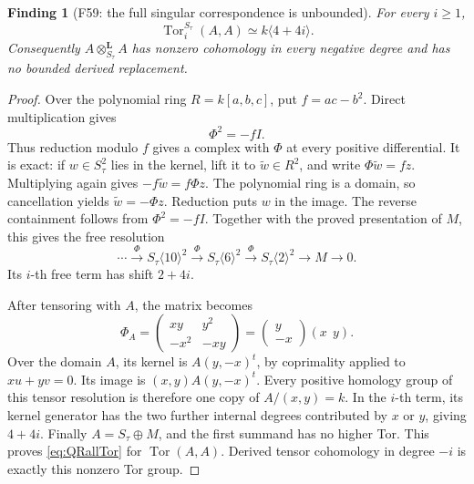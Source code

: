 \documentclass[11pt,a4paper]{article}
\theoremstyle{named}\newtheorem{finding}{Finding}[section]
\theoremstyle{definition}\newtheorem{definition}[finding]{Definition}
\theoremstyle{remark}\newtheorem{remark}[finding]{Remark}
\begin{document}
\begin{finding}[F59: the full singular correspondence is unbounded]\label{prop:QRallTor}
For every \(i\geq1\),
\begin{equation}\label{eq:QRallTor}
             \operatorname{Tor}^{S_\tau}_i(A,A)
                    \simeq k\langle4+4i\rangle.
\end{equation}
Consequently \(A\otimes^{\mathbf L}_{S_\tau}A\)
has nonzero cohomology in every negative degree
and has no bounded derived replacement.
\end{finding}

\begin{proof}
Over the polynomial ring \(R=k[a,b,c]\), put
\(f=ac-b^2\). Direct multiplication gives
\[
                         \Phi^2=-fI.
\]
Thus reduction modulo \(f\) gives a complex with
\(\Phi\) at every positive differential. It is exact:
if \(w\in S_\tau^2\) lies in the kernel, lift it
to \(\widetilde w\in R^2\), and write
\(\Phi\widetilde w=fz\). Multiplying again gives
\(-f\widetilde w=f\Phi z\). The polynomial ring is
a domain, so cancellation yields
\(\widetilde w=-\Phi z\). Reduction puts \(w\)
in the image. The reverse containment follows
from \(\Phi^2=-fI\).
Together with the proved presentation of \(M\),
this gives the free resolution
\[
 \cdots\xrightarrow{\Phi}S_\tau\langle10\rangle^2
 \xrightarrow{\Phi}S_\tau\langle6\rangle^2
 \xrightarrow{\Phi}S_\tau\langle2\rangle^2
 \longrightarrow M\longrightarrow0.
\]
Its \(i\)-th free term has shift \(2+4i\).

After tensoring with \(A\), the matrix becomes
\[
 \Phi_A=
 \begin{pmatrix}xy&y^2\\-x^2&-xy\end{pmatrix}
      =\begin{pmatrix}y\\-x\end{pmatrix}(x\ \ y).
\]
Over the domain \(A\), its kernel is
\(A(y,-x)^t\), by coprimality applied to
\(xu+yv=0\). Its image is
\((x,y)A(y,-x)^t\). Every positive homology group
of this tensor resolution is therefore one copy
of \(A/(x,y)=k\).
In the \(i\)-th term, its kernel generator has
the two further internal degrees contributed
by \(x\) or \(y\), giving \(4+4i\).
Finally \(A=S_\tau\oplus M\), and the first
summand has no higher Tor. This proves
\eqref{eq:QRallTor} for \(\operatorname{Tor}(A,A)\).
Derived tensor cohomology in degree \(-i\) is
exactly this nonzero Tor group.
\end{proof}
\end{document}
